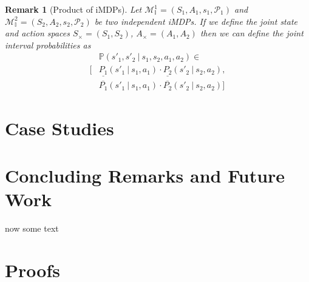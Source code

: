 \documentclass[twoside,twocolumn]{article}
\newtheorem{remark}{Remark}
\newcommand\given[1][]{\:#1\vert\:}
\begin{document}
\begin{remark}[Product of iMDPs]
	Let $\mathcal{M}^1_\mathbb{I}=(S_1,A_1,s_1,\mathcal{P}_1)$ and $\mathcal{M}^2_\mathbb{I}=(S_2,A_2,s_2,\mathcal{P}_2)$ be two independent iMDPs. If we define the joint state and action spaces $S_\times=(S_1,S_2)$, $A_\times=(A_1,A_2)$ then we can define the joint interval probabilities as
\begin{equation}
	\begin{aligned}
	&\mathbb{P}(s'_1,s'_2 \given s_1,s_2,a_1,a_2) \in \\
	[&\underline{P_1}(s'_1 \given s_1,a_1) \cdot \underline{P_2}(s'_2\given s_2,a_2),\\
	 &\overline{P_1}(s'_1 \given s_1,a_1) \cdot \overline{P_2}(s'_2 \given s_2,a_2)]
	\end{aligned}
\end{equation}
\end{remark}


\section{Case Studies}

\section{Concluding Remarks and Future Work}
now some text


\appendix
\section{Proofs}
\end{document}
